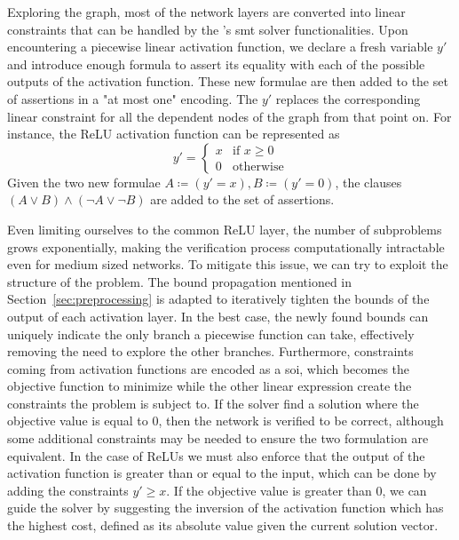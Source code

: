\documentclass[runningheads]{llncs}
\begin{document}
Exploring the graph, most of the network layers are converted into linear constraints that can be handled by the \dlinear's \gls{smt} solver functionalities.
Upon encountering a piecewise linear activation function, we declare a fresh variable $y'$ and introduce enough formula to assert its equality with each of the possible outputs of the activation function.
These new formulae are then added to the set of assertions in a "at most one" encoding.
The $y'$ replaces the corresponding linear constraint for all the dependent nodes of the graph from that point on.
For instance, the ReLU activation function can be represented as
\begin{equation*}
    y' = \begin{cases}
        x & \text{if } x \ge 0 \\
        0 & \text{otherwise}
    \end{cases}
\end{equation*}
Given the two new formulae $A \coloneqq (y' = x), B \coloneqq (y' = 0)$, the clauses $(A \lor B) \land (\neg A \lor \neg B)$ are added to the set of assertions.

Even limiting ourselves to the common ReLU layer, the number of subproblems grows exponentially, making the verification process computationally intractable even for medium sized networks.
To mitigate this issue, we can try to exploit the structure of the problem.
The bound propagation mentioned in Section~\ref{sec:preprocessing} is adapted to iteratively tighten the bounds of the output of each activation layer.
In the best case, the newly found bounds can uniquely indicate the only branch a piecewise function can take, effectively removing the need to explore the other branches.
Furthermore, constraints coming from activation functions are encoded as a \gls{soi}, which becomes the objective function to minimize while the other linear expression create the constraints the problem is subject to.
If the solver find a solution where the objective value is equal to $0$, then the network is verified to be correct, although some additional constraints may be needed to ensure the two formulation are equivalent.
In the case of ReLUs we must also enforce that the output of the activation function is greater than or equal to the input, which can be done by adding the constraints $y' \ge x$.
If the objective value is greater than $0$, we can guide the solver by suggesting the inversion of the activation function which has the highest cost, defined as its absolute value given the current solution vector.
\end{document}
